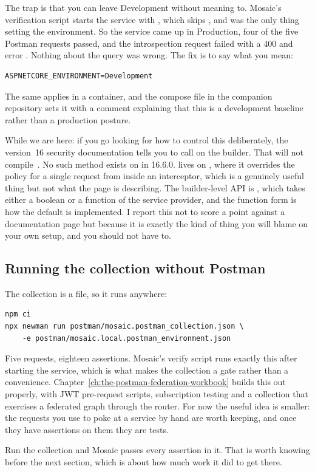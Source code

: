 The trap is that you can leave Development without meaning to. Mosaic's
verification script starts the service with , which
skips , and  was the only
thing setting the environment. So the service came up in Production, four of the
five Postman requests passed, and the introspection request failed with a 400
and error . Nothing about the query was wrong. The fix is to say
what you mean:

\begin{verbatim}
ASPNETCORE_ENVIRONMENT=Development
\end{verbatim}

The same applies in a container, and the compose file in the companion
repository sets it with a comment explaining that this is a development
baseline rather than a production posture.

%
While we are here: if you go looking for how to control this deliberately, the
version~16 security documentation tells you to call
 on the builder. That will not
compile~\autocite{chillicream2026introspection}. No such method exists on
 in 16.6.0.  lives on
, where it overrides the policy for a single
request from inside an interceptor, which is a genuinely useful thing but not
what the page is describing. The builder-level API is ,
which takes either a boolean or a function of the service provider, and the
function form is how the default is implemented. I report this not to score a
point against a documentation page but because it is exactly the kind of thing
you will blame on your own setup, and you should not have to.

\subsection*{Running the collection without Postman}

The collection is a file, so it runs anywhere:

\begin{verbatim}
npm ci
npx newman run postman/mosaic.postman_collection.json \
    -e postman/mosaic.local.postman_environment.json
\end{verbatim}

Five requests, eighteen assertions. Mosaic's verify script runs exactly this
after starting the service, which is what makes the collection a gate rather
than a convenience. Chapter~\ref{ch:the-postman-federation-workbook} builds this
out properly, with JWT pre-request scripts, subscription testing and a
collection that exercises a federated graph through the router. For now the
useful idea is smaller: the requests you use to poke at a service by hand are
worth keeping, and once they have assertions on them they are tests.

Run the collection and Mosaic passes every assertion in it. That is worth
knowing before the next section, which is about how much work it did to get
there.
